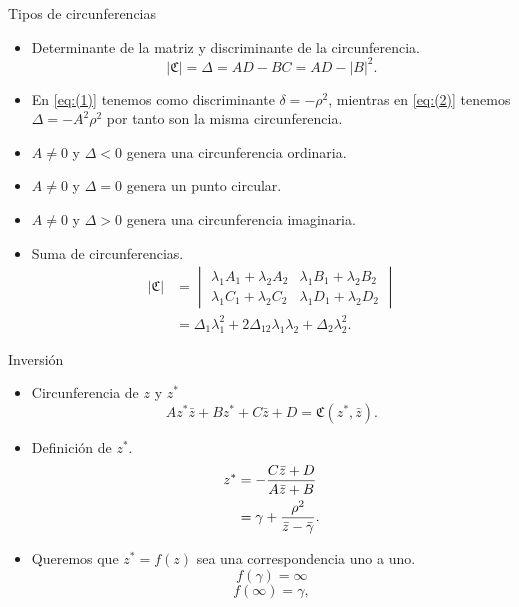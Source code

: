 \documentclass{beamer}
\begin{document}
\begin{frame}{Tipos de circunferencias}
    \begin{itemize}
        \item Determinante de la matriz y discriminante de la circunferencia.
        \begin{equation}
            |\mathfrak{C}|=\Delta = AD-BC=AD-|B|^2.
            \label{eq:(5)}
        \end{equation}
        \item En \eqref{eq:(1)} tenemos como discriminante $\delta = -\rho^2$, mientras en \eqref{eq:(2)} tenemos $\Delta = -A^2\rho^2$ por tanto son la misma circunferencia.
        \item $A \neq 0$ y $\Delta < 0$ genera una circunferencia ordinaria.
        \item $A \neq 0$ y $\Delta = 0$ genera un punto circular.
        \item $A \neq 0$ y $\Delta > 0$ genera una circunferencia imaginaria.
        \item Suma de circunferencias.
        \begin{align}
            |\mathfrak{C}|&=
            \begin{vmatrix}
                \lambda_1A_1+\lambda_2A_2 & \lambda_1B_1+\lambda_2B_2\\
                \lambda_1C_1+\lambda_2C_2 &
                \lambda_1D_1+\lambda_2D_2
            \end{vmatrix}\\
            &=\Delta_1\lambda^2_1+2\Delta_{12}\lambda_1\lambda_2+\Delta_2\lambda^2_2.
            \label{eq:(9)}
        \end{align}
    \end{itemize}
\end{frame}
\begin{frame}{Inversión}
    \begin{itemize}
        \item Circunferencia de $z$ y $z^*$
        \begin{equation}
            Az^*\bar{z}+Bz^*+C\bar{z}+D=\mathfrak{C}(z^*,\bar{z}).
            \label{eq:(15)}
        \end{equation}
        \item Definición de $z^*$.
        \begin{align}
            z^*&=-\frac{C\bar{z}+D}{A\bar{z}+B}\notag\\
            &=\gamma+\frac{\rho^2}{\bar{z}-\bar{\gamma}}.
            \label{eq:(16)}
        \end{align}
        \item Queremos que  $z^*=f(z)$ sea una correspondencia uno a uno.
        \begin{equation}
            f(\gamma)=\infty
            \label{eq:(17)}
        \end{equation}
        \begin{equation}
            f(\infty)=\gamma,
            \label{eq:(18)}
        \end{equation}
    \end{itemize}
\end{frame}
\end{document}
